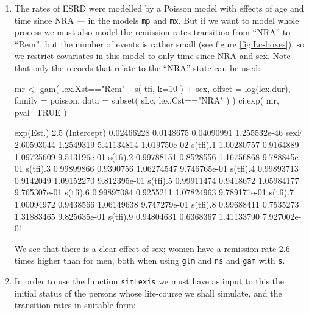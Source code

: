 \begin{enumerate}[resume] 

  
\item The rates of ESRD were modelled by a Poisson model with effects
  of age and time since NRA --- in the models \texttt{mp} and
  \texttt{mx}.  But if we want to model whole process we must also
  model the remission rates transition from ``NRA'' to ``Rem'', but
  the number of events is rather small (see figure
  \ref{fig:Lc-boxes}), so we restrict covariates in this model to only time since
  NRA and sex. Note that only the records that relate to the ``NRA'' state
  can be used:
\begin{Schunk}
\begin{Sinput}
 mr <- gam( lex.Xst=="Rem" ~ s( tfi, k=10 ) + sex,
            offset = log(lex.dur),
            family = poisson,
              data = subset( sLc, lex.Cst=="NRA" ) )
 ci.exp( mr, pval=TRUE )
\end{Sinput}
\begin{Soutput}
             exp(Est.)      2.5%      97.5%            P
(Intercept) 0.02466228 0.0148675 0.04090991 1.255532e-46
sexF        2.60593044 1.2549319 5.41134814 1.019750e-02
s(tfi).1    1.00280757 0.9164889 1.09725609 9.513196e-01
s(tfi).2    0.99788151 0.8528556 1.16756868 9.788845e-01
s(tfi).3    0.99899866 0.9390756 1.06274547 9.746765e-01
s(tfi).4    0.99893713 0.9142049 1.09152270 9.812395e-01
s(tfi).5    0.99911474 0.9418672 1.05984177 9.765307e-01
s(tfi).6    0.99897084 0.9255211 1.07824963 9.789171e-01
s(tfi).7    1.00094972 0.9438566 1.06149638 9.747279e-01
s(tfi).8    0.99688411 0.7535273 1.31883465 9.825635e-01
s(tfi).9    0.94804631 0.6368367 1.41133790 7.927002e-01
\end{Soutput}
\end{Schunk}
We see that there is a clear effect of sex; women have a remission
rate 2.6 times higher than for men, both when using \texttt{glm} and
\texttt{ns} and \texttt{gam} with \texttt{s}.


\item In order to use the function \texttt{simLexis} we must have as input
  to this the initial status of the persons whose life-course we
  shall simulate, and the transition rates in suitable form:


\end{enumerate}
